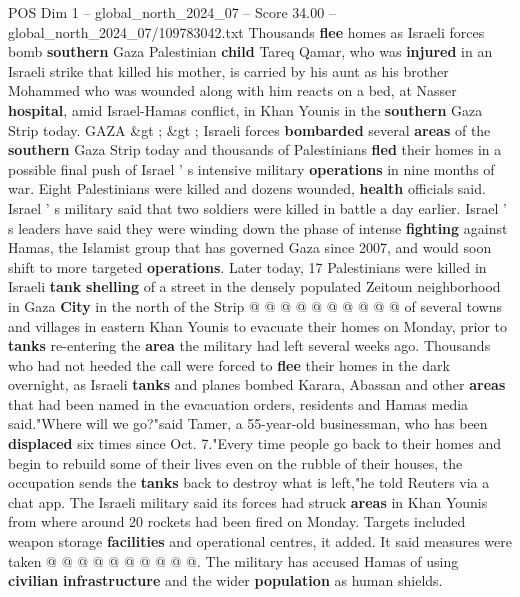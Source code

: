 \begin{textsample}{POS Dim 1 – global\_north\_2024\_07 – Score 34.00 – global\_north\_2024\_07/109783042.txt}  \label{ex:f1_pos_384}
Thousands \textbf{flee} homes as Israeli forces bomb \textbf{southern} Gaza Palestinian \textbf{child} Tareq Qamar, who was \textbf{injured} in an Israeli strike that killed his mother, is carried by his aunt as his brother Mohammed who was wounded along with him reacts on a bed, at Nasser \textbf{hospital}, amid Israel-Hamas conflict, in Khan Younis in the \textbf{southern} Gaza Strip today.
GAZA \&gt ; \&gt ; Israeli forces \textbf{bombarded} several \textbf{areas} of the \textbf{southern} Gaza Strip today and thousands of Palestinians \textbf{fled} their homes in a possible final push of Israel ' s intensive military \textbf{operations} in nine months of war.
Eight Palestinians were killed and dozens wounded, \textbf{health} officials said.
Israel ' s military said that two soldiers were killed in battle a day earlier.
Israel ' s leaders have said they were winding down the phase of intense \textbf{fighting} against Hamas, the Islamist group that has governed Gaza since 2007, and would soon shift to more targeted \textbf{operations}.
Later today, 17 Palestinians were killed in Israeli \textbf{tank} \textbf{shelling} of a street in the densely populated Zeitoun neighborhood in Gaza \textbf{City} in the north of the Strip @ @ @ @ @ @ @ @ @ @ of several towns and villages in eastern Khan Younis to evacuate their homes on Monday, prior to \textbf{tanks} re-entering the \textbf{area} the military had left several weeks ago.
Thousands who had not heeded the call were forced to \textbf{flee} their homes in the dark overnight, as Israeli \textbf{tanks} and planes bombed Karara, Abassan and other \textbf{areas} that had been named in the evacuation orders, residents and Hamas media said."Where will we go?"said Tamer, a 55-year-old businessman, who has been \textbf{displaced} six times since Oct. 7."Every time people go back to their homes and begin to rebuild some of their lives even on the rubble of their houses, the occupation sends the \textbf{tanks} back to destroy what is left,"he told Reuters via a chat app.
The Israeli military said its forces had struck \textbf{areas} in Khan Younis from where around 20 rockets had been fired on Monday.
Targets included weapon storage \textbf{facilities} and operational centres, it added.
It said measures were taken @ @ @ @ @ @ @ @ @ @.
The military has accused Hamas of using \textbf{civilian} \textbf{infrastructure} and the wider \textbf{population} as human shields.

\end{textsample}
